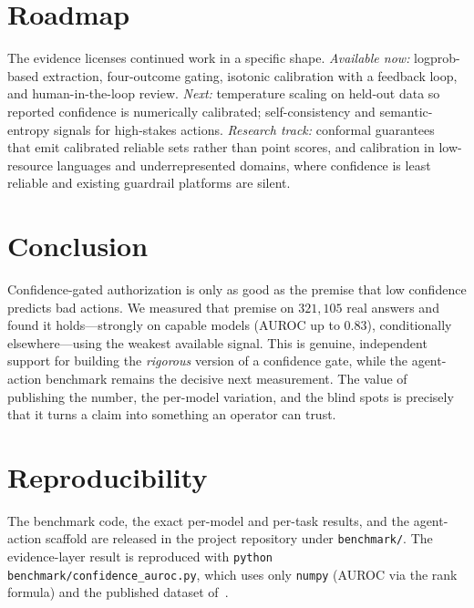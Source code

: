 \documentclass[10pt,twocolumn]{article}
\begin{document}
\section{Roadmap}
The evidence licenses continued work in a specific shape. \emph{Available now:}
logprob-based extraction, four-outcome gating, isotonic calibration with a
feedback loop, and human-in-the-loop review. \emph{Next:} temperature scaling on
held-out data so reported confidence is numerically calibrated; self-consistency
and semantic-entropy signals for high-stakes actions. \emph{Research track:}
conformal guarantees~\cite{angelopoulos2021gentle} that emit calibrated reliable
sets rather than point scores, and calibration in low-resource languages and
underrepresented domains, where confidence is least reliable and existing
guardrail platforms are silent.

\section{Conclusion}
Confidence-gated authorization is only as good as the premise that low confidence
predicts bad actions. We measured that premise on $321{,}105$ real answers and
found it holds---strongly on capable models (AUROC up to $0.83$), conditionally
elsewhere---using the weakest available signal. This is genuine, independent
support for building the \emph{rigorous} version of a confidence gate, while the
agent-action benchmark remains the decisive next measurement. The value of
publishing the number, the per-model variation, and the blind spots is precisely
that it turns a claim into something an operator can trust.

\section*{Reproducibility}
The benchmark code, the exact per-model and per-task results, and the
agent-action scaffold are released in the project repository under
\texttt{benchmark/}. The evidence-layer result is reproduced with
\texttt{python benchmark/confidence\_auroc.py}, which uses only \texttt{numpy}
(AUROC via the rank formula) and the published dataset
of~\cite{plaut2025probabilities}.
\end{document}
